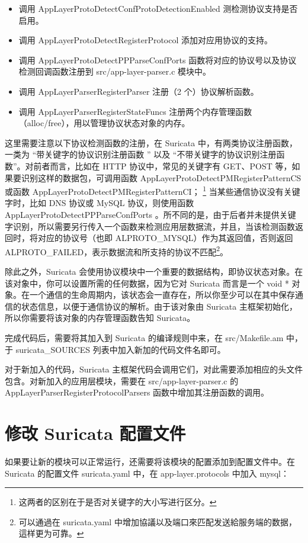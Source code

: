 \begin{itemize}
    \item 调用 {\cf AppLayerProtoDetectConfProtoDetectionEnabled} 测检测协议支持是否启用。
    \item 调用 {\cf AppLayerProtoDetectRegisterProtocol} 添加对应用协议的支持。
    \item 调用 {\cf AppLayerProtoDetectPPParseConfPorts} 函数将对应的协议号以及协议检测回调函数注册到 {\ff src/app-layer-parser.c} 模块中。
    \item 调用 {\cf AppLayerParserRegisterParser} 注册（2 个）协议解析函数。
    \item 调用 {\cf AppLayerParserRegisterStateFuncs} 注册两个内存管理函数（alloc/free），用以管理协议状态对象的内存。
\end{itemize}

这里需要注意以下协议检测函数的注册，在 Suricata 中，有两类协议注册函数，一类为 ``带关键字的协议识别注册函数 '' 以及 ``不带关键字的协议识别注册函数''。对前者而言，比如在 HTTP 协议中，常见的关键字有 {\cf GET}、{\cf POST} 等，如果要识别这样的数据包，可调用函数 {\cf AppLayerProtoDetectPMRegisterPatternCS} 或函数 {\cf AppLayerProtoDetectPMRegisterPatternCI}；
\footnote{这两者的区别在于是否对关键字的大小写进行区分。}
当某些通信协议没有关键字时，比如 DNS 协议或 MySQL 协议，则使用函数 {\cf AppLayerProtoDetectPPParseConfPorts} 。所不同的是，由于后者并未提供关键字识别，所以需要另行传入一个函数来检测应用层数据流，并且，当该检测函数返回时，将对应的协议号（也即 {\cf ALPROTO\_MYSQL}）作为其返回值，否则返回 {\cf ALPROTO\_FAILED}，表示数据流和所支持的协议不匹配\footnote{可以通過在 {\ff suricata.yaml} 中增加協議以及端口來匹配发送給服务端的数据，這样更为可靠。}。

除此之外，Suricata 会使用协议模块中一个重要的数据结构，即协议状态对象。在该对象中，你可以设置所需的任何数据，因为它对 Suricata 而言是一个 {\cf void *} 对象。在一个通信的生命周期内，该状态会一直存在，所以你至少可以在其中保存通信的状态信息，以便于通信协议的解析。由于该对象由 Suricata 主框架初始化，所以你需要将该对象的内存管理函数告知 Suricata。

完成代码后，需要将其加入到 Suricata 的编译规则中来，在 {\ff src/Makefile.am} 中，于 {\cf suricata\_SOURCES} 列表中加入新加的代码文件名即可。

对于新加入的代码，Suricata 主框架代码会调用它们，对此需要添加相应的头文件包含。对新加入的应用层模块，需要在 {\ff src/app-layer-parser.c} 的 {\cf AppLayerParserRegisterProtocolParsers} 函数中增加其注册函数的调用。

\section{修改 Suricata 配置文件}
如果要让新的模块可以正常运行，还需要将该模块的配置添加到配置文件中。在 Suricata 的配置文件 {\ff suricata.yaml} 中，在 {\cf app-layer.protocols} 中加入 {\cf mysql}：

